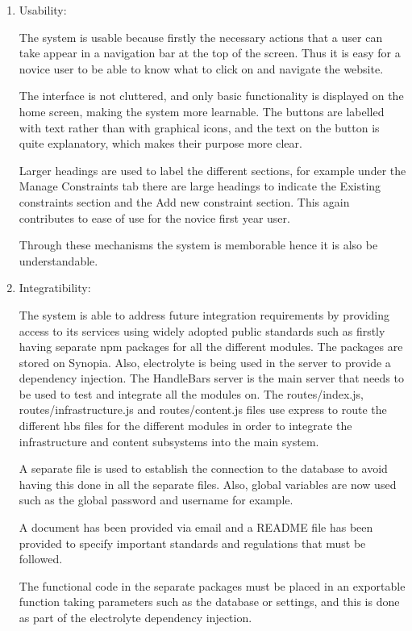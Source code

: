 \documentclass[hidelinks, 12pt, oneside]{article}
\begin{document}
\begin{enumerate}
\item Usability:

The system is usable because firstly the necessary actions that a user can take appear in a navigation bar at the top of the screen. Thus it is easy for a novice user to be able to know what to click on and navigate the website. 

The interface is not cluttered, and only basic functionality is displayed on the home screen, making the system more learnable. The buttons are labelled with text rather than with graphical icons, and the text on the button is quite explanatory, which makes their purpose more clear. 

Larger headings are used to label the different sections, for example under the Manage Constraints tab there are large headings to indicate the Existing constraints section and the Add new constraint section. This again contributes to ease of use for the novice first year user.

Through these mechanisms the system is memborable hence it is also be understandable.  

\item Integratibility:

The system is able to address future integration requirements by providing access to its services using widely adopted public standards such as firstly having separate npm packages for all the different modules. The packages are stored on Synopia. Also, electrolyte is being used in the server to provide a dependency injection. The HandleBars server is the main server that needs to be used to test and integrate all the modules on. The routes/index.js, routes/infrastructure.js and routes/content.js files use express to route the different hbs files for the different modules in order to integrate the infrastructure and content subsystems into the main system. 

A separate file is used to establish the connection to the database to avoid having this done in all the separate files. Also, global variables are now used such as the global password and username for example. 

A document has been provided via email and a README file has been provided to specify important standards and regulations that must be followed.

The functional code in the separate packages must be placed in an exportable function taking parameters such as the database or settings, and this is done as part of the electrolyte dependency injection. 


\end{enumerate}
\end{document}
